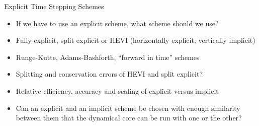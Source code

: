 \begin{slide}{Explicit Time Stepping Schemes}

\begin{itemize}
\item If we have to use an explicit scheme, what scheme should we use?

\item Fully explicit, split explicit or HEVI (horizontally explicit, vertically implicit)

\item Runge-Kutte, Adams-Bashforth, ``forward in time'' schemes

\item Splitting and conservation errors of HEVI and split explicit?
\end{itemize}


\begin{itemize}
\item Relative efficiency, accuracy and scaling of explicit versus implicit

\item Can an explicit and an implicit scheme be chosen with enough similarity between them that the dynamical core can be run with one or the other?

\end{itemize}

\end{slide}

